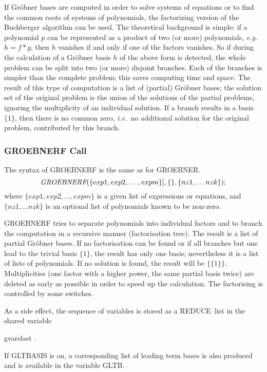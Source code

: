 \documentclass[11pt,letterpaper]{book}
\makeatletter
\newcommand{\REDUCE}{REDUCE}
\newcommand{\underscore}{\_}
\newcommand{\ttindex}[1]{{\renewcommand{\_}{\protect\underscore}%
                          \index{#1@{\tt #1}}}}
\makeatother
\begin{document}
If Gr\"obner bases are computed in order to solve systems of equations
or to find the common roots of systems of polynomials, the factorizing
version of the Buchberger algorithm can be used.  The theoretical
background is simple: if a polynomial $p$ can be represented as a
product of two (or more) polynomials, {\em e.g.\ } $h= f*g$, then $h$
vanishes if and only if one of the factors vanishes.  So if during the
calculation of a Gr\"obner basis $h$ of the above form is detected,
the whole problem can be split into two (or more) disjoint branches.
Each of the branches is simpler than the complete problem; this saves
computing time and space.  The result of this type of computation is a
list of (partial) Gr\"obner bases; the solution set of the original
problem is the union of the solutions of the partial problems,
ignoring the multiplicity of an individual solution.  If a branch
results in a basis $\{1\}$, then there is no common zero, {\em i.e.\ }no
additional solution for the original problem, contributed by this
branch.

\subsubsection{GROEBNERF Call}
\ttindex{GROEBNERF}
The syntax of GROEBNERF is the same as for GROEBNER.
\[
\mbox{\it GROEBNERF}(\{exp1, exp2, \ldots , expm\}
         [,\{\},\{nz1, \ldots nzk\});
\]
where $\{exp1, exp2, \ldots , expm\} $ is a given list of expressions or
equations, and $\{nz1, \ldots nzk\}$ is
an optional list of polynomials known to be non-zero.

GROEBNERF tries to separate polynomials into individual factors and
to branch the computation in a recursive manner (factorisation tree).
The result is a list of partial Gr\"obner bases.  If no factorisation can
be found or if all branches but one lead to the trivial basis $\{1\}$,
the result has only one basis; nevertheless it is a list of lists of
polynomials.  If no solution is found, the result will be $\{\{1\}\}$.
Multiplicities (one factor with a higher power, the same partial basis
twice) are deleted as early as possible in order to speed up the
calculation.  The factorising is controlled by some switches.

As a side effect, the sequence of variables is stored as a \REDUCE\ list in
the shared variable
\begin{center}
gvarslast .
\end{center}
If GLTBASIS is on, a corresponding list of leading term bases is
also produced and is available in the variable GLTB.
\end{document}
